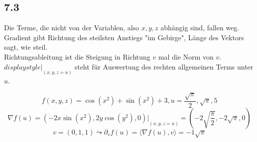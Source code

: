 \documentclass[
    accentcolor=pink,
    boxarc,
    dark_mode,
    logofile=enmpty
]{rubos-tuda-template}
\begin{document}
    \subsection*{7.3}
    \begin{anmerkungen}
        Die Terme, die nicht von der Variablen, also $x,y,z$ abhängig sind, fallen weg.\\
        Gradient gibt Richtung des steilsten Anstiegs "im Gebirge", Länge des Vektors sagt, wie steil.\\
        Richtungsableitung ist die Steigung in Richtung $v$ mal die Norm von $v$.\\
        \(displaystyle{\big|\underset{(x,y,z = u)}{}}\) steht für Auswertung des rechten allgemeinen Terms unter $u$.
    \end{anmerkungen}
    \[f(x,y,z) = \cos(x^2) + \sin(x^2) + 3, u=\frac{\sqrt\pi}{2},\sqrt\pi,5\]
    \[\nabla f(u)=(-2x\sin(x^2),2y\cos(y^2),0)\big|\underset{(x,y,z = u)}{}=(-2\sqrt{\frac{\pi}{2}}, -2\sqrt\pi, 0)\]
    \[v=(0,1,1) \leadsto \partial_vf(u)=\langle\nabla f(u),v\rangle=-1\sqrt\pi\]
\end{document}
